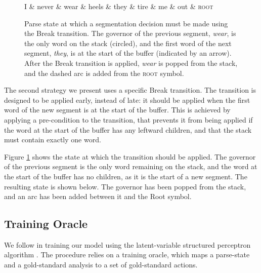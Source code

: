 \documentclass[11pt,letterpaper]{article}
\begin{document}
\begin{figure}
\begin{dependency}[theme=simple, edge unit distance=1.0ex]
    \begin{deptext}[row sep=2.0ex]
        I \& never \& wear \& heels \& they \& tire \& me \& out \& \textsc{root} \\
    \end{deptext}

    \end{dependency}
    \caption{\small Parse state at which a segmentation decision must be made
        using the Break transition.  The governor of the previous segment,
        \emph{wear},  is
        the only word on the stack (circled), and the first word of the
        next segment, \emph{they}, is at the start of the buffer (indicated by
        an arrow). After the Break transition is applied, \emph{wear} is popped
    from the stack, and the dashed arc is added from the \textsc{root} symbol.
    \label{fig:break_state}}
\vspace*{-3em}
\end{figure}
The second strategy we present uses a specific Break transition.  The transition
is designed to be applied early, instead of late: it should be applied
when the first word of the new segment is at the start of the buffer.  This is
achieved by applying a pre-condition to the transition, that prevents it from being
applied if the word at the start of the buffer has any
leftward children, and that the stack must contain exactly one word.

Figure \ref{fig:break_state} shows the state at which the transition should
be applied.  The governor of the previous segment is the only word remaining
on the stack, and the word at the start of the buffer has no children, as it
is the start of a new segment.
The resulting state is shown below.  The governor has been popped from the stack,
and an arc has been added between it and the Root symbol. 

\subsection{Training Oracle}

We follow \citet{honnibal:14} in training our model using the latent-variable
structured perceptron algorithm \citep{sun:09}.  The procedure relies on a training
oracle, which maps a parse-state and a gold-standard analysis to a set of gold-standard
actions.
\end{document}
